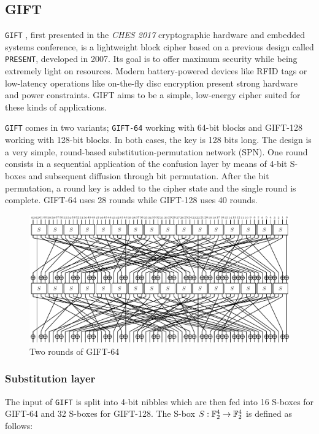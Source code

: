 \subsection{GIFT}

\texttt{GIFT} \cite{gift:2017}, first presented in the \textit{CHES 2017}
cryptographic hardware and embedded systems conference, is a lightweight block
cipher based on a previous design called \texttt{PRESENT}, developed in 2007. Its
goal is to offer maximum security while being extremely light on resources.
Modern battery-powered devices like RFID tags or low-latency operations like
on-the-fly disc encryption present strong hardware and power constraints. GIFT
aims to be a simple, low-energy cipher suited for these kinds of applications.

\texttt{GIFT} comes in two variants; \verb|GIFT-64| working with 64-bit blocks
and GIFT-128 working with 128-bit blocks. In both cases, the key is 128
bits long. The design is a very simple, round-based substitution-permutation
network (SPN). One round consists in a sequential application of the confusion
layer by means of 4-bit S-boxes and subsequent diffusion through bit
permutation. After the bit permutation, a round key is added to the cipher
state and the single round is complete. GIFT-64 uses 28 rounds while
GIFT-128 uses 40 rounds.

\begin{figure}[h!]
    \centering
    \includegraphics[width=\textwidth]{Figures/GIFT-64.pdf}
    \caption{Two rounds of GIFT-64}
\end{figure}

\subsubsection{Substitution layer}

The input of \texttt{GIFT} is split into 4-bit nibbles which are then fed into
16 S-boxes for GIFT-64 and 32 S-boxes for GIFT-128. The S-box
$S:\mathbb{F}_2^{4}\rightarrow \mathbb{F}_2^{4}$ is defined as follows:

